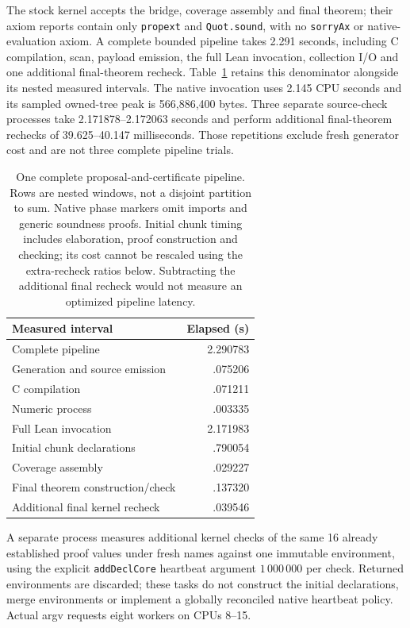\documentclass[10pt,twocolumn]{article}
\begin{document}
The stock kernel accepts the bridge, coverage assembly and final theorem;
their axiom reports contain only \texttt{propext} and \texttt{Quot.sound},
with no \texttt{sorryAx} or native-evaluation axiom.
A complete bounded pipeline takes 2.291 seconds, including C compilation,
scan, payload emission, the full Lean invocation, collection I/O and one
additional final-theorem recheck. Table~\ref{tab:grid-pipeline-clocks}
retains this denominator alongside its nested measured intervals.
The native invocation uses 2.145 CPU seconds and its sampled owned-tree
peak is 566,886,400 bytes. Three separate source-check processes take
2.171878--2.172063 seconds and perform additional final-theorem rechecks
of 39.625--40.147 milliseconds. Those repetitions exclude fresh generator
cost and are not three complete pipeline trials.

\begin{table}[t]
\centering
\small
\setlength{\tabcolsep}{3pt}
\begin{tabular}{lr}
\toprule
Measured interval & Elapsed (s) \\
\midrule
Complete pipeline & 2.290783 \\
Generation and source emission & .075206 \\
\quad C compilation & .071211 \\
\quad Numeric process & .003335 \\
Full Lean invocation & 2.171983 \\
\quad Initial chunk declarations & .790054 \\
\quad Coverage assembly & .029227 \\
\quad Final theorem construction/check & .137320 \\
\quad Additional final kernel recheck & .039546 \\
\bottomrule
\end{tabular}
\caption{One complete proposal-and-certificate pipeline. Rows are nested
windows, not a disjoint partition to sum. Native phase markers omit imports
and generic soundness proofs. Initial chunk timing includes elaboration,
proof construction and checking; its cost cannot be rescaled using the
extra-recheck ratios below. Subtracting the additional final recheck would
not measure an optimized pipeline latency.}
\label{tab:grid-pipeline-clocks}
\end{table}

A separate process measures additional kernel checks of the same 16
already established proof values under fresh names against one immutable
environment, using the explicit \texttt{addDeclCore} heartbeat argument
$1\,000\,000$ per check. Returned environments are discarded; these tasks
do not construct the initial declarations, merge environments or implement
a globally reconciled native heartbeat policy. Actual argv requests eight
workers on CPUs 8--15.
\end{document}
